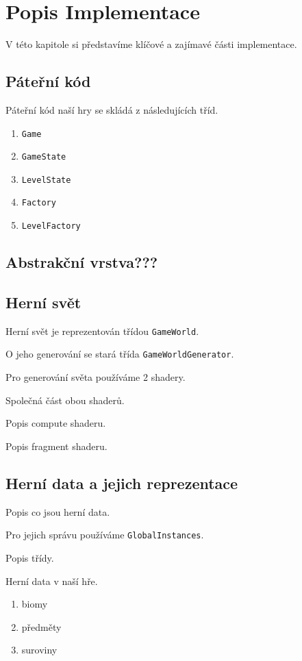 \chapter{Popis Implementace}
V této kapitole si představíme klíčové a zajímavé části implementace.

\section{Páteřní kód}
Páteřní kód naší hry se skládá z následujících tříd.

\begin{enumerate}
    \item \verb|Game|
    \item \verb|GameState|
    \item \verb|LevelState|
    \item \verb|Factory|
    \item \verb|LevelFactory|
\end{enumerate}

\section{Abstrakční vrstva???}

\section{Herní svět}
Herní svět je reprezentován třídou \verb|GameWorld|.

O jeho generování se stará třída \verb|GameWorldGenerator|.

Pro generování světa používáme 2 shadery.

Společná část obou shaderů.

Popis compute shaderu.

Popis fragment shaderu.

\section{Herní data a jejich reprezentace}
Popis co jsou herní data.

Pro jejich správu používáme \verb|GlobalInstances|.

Popis třídy.

Herní data v naší hře.

\begin{enumerate}
    \item biomy
    \item předměty
    \item suroviny
\end{enumerate}

